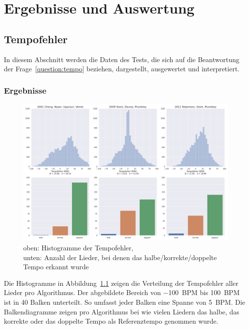 \chapter{Ergebnisse und Auswertung}
\label{ergebnisse}
\acresetall

\section{Tempofehler}
{
	In diesem Abschnitt werden die Daten des Tests,
		die sich auf die Beantwortung der Frage~\ref{question:tempo} beziehen,
		dargestellt, ausgewertet und interpretiert.

	\subsection{Ergebnisse}
	{
		\begin{figure}[h]
			\hspace{-17mm}
			\includegraphics[scale=0.4]{resources/tempo_error_histogram.png}
			\caption{
				oben: Histogramme der Tempofehler, \\
				unten: Anzahl der Lieder, bei denen das halbe/korrekte/doppelte Tempo erkannt wurde
			}
			\label{fig:tempoerror}
		\end{figure}

		Die Histogramme in Abbildung~\ref{fig:tempoerror} zeigen die Verteilung der Tempofehler aller Lieder pro Algorithmus.
		Der abgebildete Bereich von \SI{-100}{\ac{BPM}} bis \SI{100}{\ac{BPM}} ist in \num{40} Balken unterteilt.
		So umfasst jeder Balken eine Spanne von \SI{5}{\ac{BPM}}.
		Die Balkendiagramme zeigen pro Algorithmus
			bei wie vielen Liedern das halbe, das korrekte oder das doppelte Tempo als Referenztempo genommen wurde.

}}
